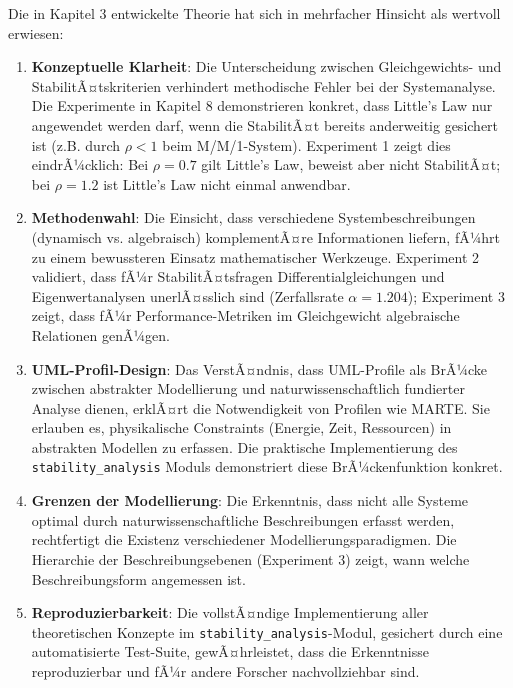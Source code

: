 ﻿\documentclass[a4paper,12pt]{report}
\theoremstyle{definition}
\begin{document}
Die in Kapitel 3 entwickelte Theorie hat sich in mehrfacher Hinsicht als wertvoll erwiesen:

\begin{enumerate}
	\item[-] \textbf{Konzeptuelle Klarheit}: Die Unterscheidung zwischen Gleichgewichts- und StabilitÃ¤tskriterien verhindert methodische Fehler bei der Systemanalyse. Die Experimente in Kapitel 8 demonstrieren konkret, dass Little's Law nur angewendet werden darf, wenn die StabilitÃ¤t bereits anderweitig gesichert ist (z.B. durch $\rho < 1$ beim M/M/1-System). Experiment 1 zeigt dies eindrÃ¼cklich: Bei $\rho = 0.7$ gilt Little's Law, beweist aber nicht StabilitÃ¤t; bei $\rho = 1.2$ ist Little's Law nicht einmal anwendbar.
	
	\item[-] \textbf{Methodenwahl}: Die Einsicht, dass verschiedene Systembeschreibungen (dynamisch vs. algebraisch) komplementÃ¤re Informationen liefern, fÃ¼hrt zu einem bewussteren Einsatz mathematischer Werkzeuge. Experiment 2 validiert, dass fÃ¼r StabilitÃ¤tsfragen Differentialgleichungen und Eigenwertanalysen unerlÃ¤sslich sind (Zerfallsrate $\alpha = 1.204$); Experiment 3 zeigt, dass fÃ¼r Performance-Metriken im Gleichgewicht algebraische Relationen genÃ¼gen.
	
	\item[-] \textbf{UML-Profil-Design}: Das VerstÃ¤ndnis, dass UML-Profile als BrÃ¼cke zwischen abstrakter Modellierung und naturwissenschaftlich fundierter Analyse dienen, erklÃ¤rt die Notwendigkeit von Profilen wie MARTE. Sie erlauben es, physikalische Constraints (Energie, Zeit, Ressourcen) in abstrakten Modellen zu erfassen. Die praktische Implementierung des \texttt{stability\_analysis} Moduls demonstriert diese BrÃ¼ckenfunktion konkret.
	
	\item[-] \textbf{Grenzen der Modellierung}: Die Erkenntnis, dass nicht alle Systeme optimal durch naturwissenschaftliche Beschreibungen erfasst werden, rechtfertigt die Existenz verschiedener Modellierungsparadigmen. Die Hierarchie der Beschreibungsebenen (Experiment 3) zeigt, wann welche Beschreibungsform angemessen ist.
	
    \item[-] \textbf{Reproduzierbarkeit}: Die vollstÃ¤ndige Implementierung
	aller theoretischen Konzepte im \texttt{stability\_analysis}-Modul,
	gesichert durch eine automatisierte Test-Suite, gewÃ¤hrleistet, dass
	die Erkenntnisse reproduzierbar und fÃ¼r andere Forscher nachvollziehbar
	sind.
\end{enumerate}
\end{document}

